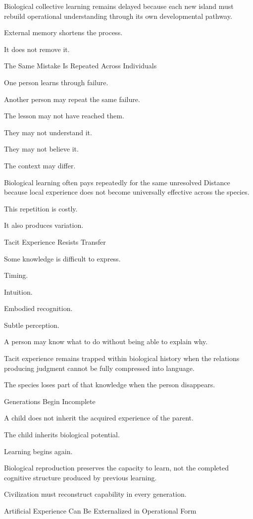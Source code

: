Biological collective learning remains delayed because each new island must rebuild operational understanding through its own developmental pathway.

External memory shortens the process.

It does not remove it.

The Same Mistake Is Repeated Across Individuals

One person learns through failure.

Another person may repeat the same failure.

The lesson may not have reached them.

They may not understand it.

They may not believe it.

The context may differ.

Biological learning often pays repeatedly for the same unresolved Distance because local experience does not become universally effective across the species.

This repetition is costly.

It also produces variation.

Tacit Experience Resists Transfer

Some knowledge is difficult to express.

Timing.

Intuition.

Embodied recognition.

Subtle perception.

A person may know what to do without being able to explain why.

Tacit experience remains trapped within biological history when the relations producing judgment cannot be fully compressed into language.

The species loses part of that knowledge when the person disappears.

Generations Begin Incomplete

A child does not inherit the acquired experience of the parent.

The child inherits biological potential.

Learning begins again.

Biological reproduction preserves the capacity to learn, not the completed cognitive structure produced by previous learning.

Civilization must reconstruct capability in every generation.

Artificial Experience Can Be Externalized in Operational Form

